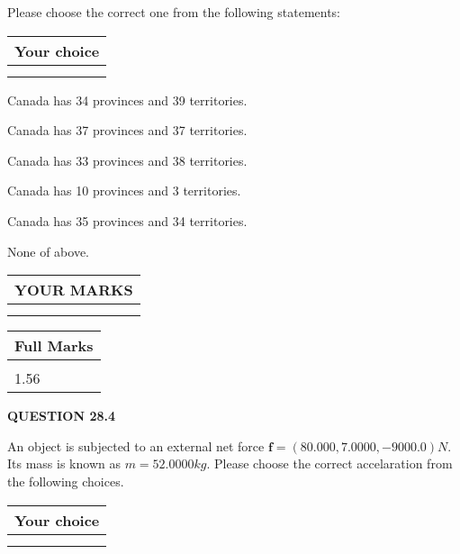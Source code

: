 \documentclass[12pt]{article}
\begin{document}
  
Please choose the correct one from the following statements:
  
  
\noindent\hspace{3.0in} \begin{tabular}{|l|}
\hline
Your choice \\
\hline
 \\ 
 \\ 
\hline
\end{tabular}
  
  
 
 
Canada has  %
34 provinces and  %
39 territories.
 
 
Canada has  %
37 provinces and  %
37 territories.
 
 
Canada has  %
33 provinces and  %
38 territories.
 
 
Canada has  %
10 provinces and  %
3 territories.
 
 
Canada has  %
35 provinces and  %
34 territories.
 
 
 None of above.
 
 
  
\vspace{0.2in}
  
\noindent\begin{tabular}{|l|}
\hline
 YOUR MARKS  \\
\hline
 \\ 
 \\ 
\hline
\end{tabular}
\hspace{0.05in} \begin{tabular}{|l|}
\hline
 Full Marks  \\
\hline
 \\ 
1.56 \\
\hline
\end{tabular}
{\textbf{\Large{QUESTION
28.4 
}}}
  
  
 
An object is subjected to an external net force $\mathbf{f}=(
80.000 ,
7.0000,
-9000.0  )N$. Its mass is known as
$m= %
52.0000  kg$. Please choose the correct accelaration
from the following choices.
 
  
  
\noindent\hspace{3.0in} \begin{tabular}{|l|}
\hline
Your choice \\
\hline
 \\ 
 \\ 
\hline
\end{tabular}
  
\end{document}

